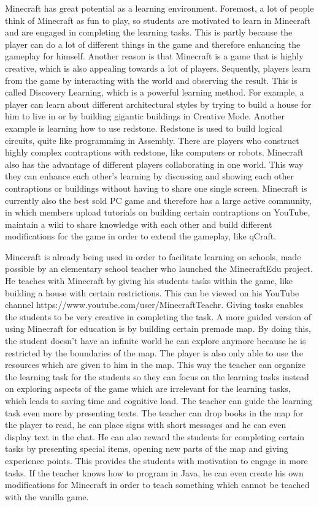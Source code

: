 \documentclass[12pt]{report} %
\begin{document}
Minecraft has great potential as a learning environment. Foremost, a lot of people think of Minecraft as fun to play, so students are motivated to learn in Minecraft and are engaged in completing the learning tasks. This is partly because the player can do a lot of different things in the game and therefore enhancing the gameplay for himself. Another reason is that Minecraft is a game that is highly creative, which is also appealing towards a lot of players. Sequently, players learn from the game by interacting with the world and observing the result. This is called Discovery Learning, which is a powerful learning method. For example, a player can learn about different architectural styles by trying to build a house for him to live in or by building gigantic buildings in Creative Mode. Another example is learning how to use redstone. Redstone is used to build logical circuits, quite like programming in Assembly. There are players who construct highly complex contraptions with redstone, like computers or robots. Minecraft also has the advantage of different players collaborating in one world. This way they can enhance each other's learning by discussing and showing each other contraptions or buildings without having to share one single screen. Minecraft is currently also the best sold PC game and therefore has a large active community, in which members upload tutorials on building certain contraptions on YouTube, maintain a wiki to share knowledge with each other and build different modifications for the game in order to extend the gameplay, like qCraft.

Minecraft is already being used in order to facilitate learning on schools, made possible by an elementary school teacher who launched the MinecraftEdu project. He teaches with Minecraft by giving his students tasks within the game, like building a house with  certain restrictions. This can be viewed on his YouTube channel https://www.youtube.com/user/MinecraftTeachr. Giving tasks enables the students to be very creative in completing the task. A more guided version of using Minecraft for education is by building certain premade map. By doing this, the student doesn't have an infinite world he can explore anymore because he is restricted by the boundaries of the map. The player is also only able to use the resources which are given to him in the map. This way the teacher can organize the learning task for the students so they can focus on the learning tasks instead on exploring aspects of the game which are irrelevant  for the learning tasks, which leads to saving time and cognitive load. The teacher can guide the learning task even more by presenting texts. The teacher can drop books in the map for the player to read, he can place signs with short messages and he can even display text in the chat. He can also reward the students for completing certain tasks by presenting special items, opening new parts of the map and giving experience points. This provides the students with motivation to engage in more tasks. If the teacher knows how to program in Java, he can even create his own modifications for Minecraft in order to teach something which cannot be teached with the vanilla game.
\end{document}

